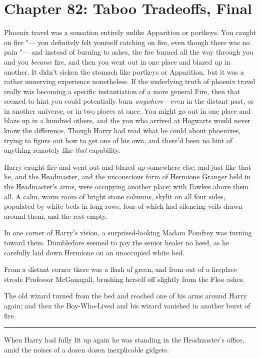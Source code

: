 \chapter{Chapter 82: Taboo Tradeoffs, Final}
Phoenix travel was a sensation entirely unlike Apparition or portkeys.
You caught on fire "--- you definitely felt yourself catching on fire, even
though there was no pain "--- and instead of burning to ashes, the fire
burned all the way through you and you \emph{became} fire, and then you
went out in one place and blazed up in another. It didn't sicken the
stomach like portkeys or Apparition, but it was a rather unnerving
experience nonetheless. If the underlying truth of phoenix travel really
was becoming a specific instantiation of a more general Fire, then that
seemed to hint you could potentially burn \emph{anywhere -} even in the
distant past, or in another universe, or in two places at once. You
might go out in one place and blaze up in a hundred others, and the you
who arrived at Hogwarts would never know the difference. Though Harry
had read what he could about phoenixes, trying to figure out how to get
one of his own, and there'd been no hint of anything remotely like
\emph{that} capability.

Harry caught fire and went out and blazed up somewhere else; and just
like that he, and the Headmaster, and the unconscious form of Hermione
Granger held in the Headmaster's arms, were occupying another place;
with Fawkes above them all. A calm, warm room of bright stone columns,
skylit on all four sides, populated by white beds in long rows, four of
which had silencing veils drawn around them, and the rest empty.

In one corner of Harry's vision, a surprised-looking Madam Pomfrey was
turning toward them. Dumbledore seemed to pay the senior healer no heed,
as he carefully laid down Hermione on an unoccupied white bed.

From a distant corner there was a flash of green, and from out of a
fireplace strode Professor McGonagall, brushing herself off slightly
from the Floo ashes.

The old wizard turned from the bed and reached one of his arms around
Harry again; and then the Boy-Who-Lived and his wizard vanished in
another burst of fire.

\begin{center}\rule{3in}{0.4pt}\end{center}

When Harry had fully lit up again he was standing in the Headmaster's
office, amid the noises of a dozen dozen inexplicable gidgets.

